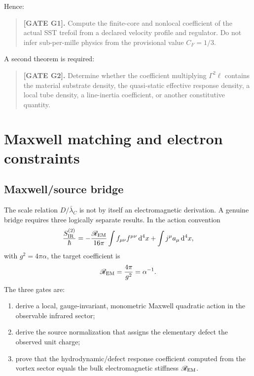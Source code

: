 \documentclass[aps,pre,preprint,notitlepage,nofootinbib,superscriptaddress]{revtex4-2}
\newcommand{\dd}{\mathrm d}
\newcommand{\lC}{\bar\lambda_C}
\begin{document}
Hence:

\begin{quote}
\textbf{[GATE G1].}
Compute the finite-core and nonlocal coefficient of the actual SST trefoil from a declared velocity profile and regulator.  Do not infer sub-per-mille physics from the provisional value \(C_F=1/3\).
\end{quote}

A second theorem is required:

\begin{quote}
\textbf{[GATE G2].}
Determine whether the coefficient multiplying \(\Gamma^2\ell\) contains the material substrate density, the quasi-static effective response density, a local tube density, a line-inertia coefficient, or another constitutive quantity.
\end{quote}

\section{Maxwell matching and electron constraints}
\label{sec:constraints}

\subsection{Maxwell/source bridge}

The scale relation \(D/\lC\) is not by itself an electromagnetic derivation.  A genuine bridge requires three logically separate results.  In the action convention
\begin{equation}
  \frac{S_{\rm IR}^{(2)}}{\hbar}
  =
  -\frac{\mathscr R_{\rm EM}}{16\pi}
  \int f_{\mu\nu}f^{\mu\nu}\,\dd^4x
  +
  \int j^\mu a_\mu\,\dd^4x,
  \label{eq:IR-action}
\end{equation}
with \(g^2=4\pi\alpha\), the target coefficient is
\begin{equation}
  \mathscr R_{\rm EM}
  =
  \frac{4\pi}{g^2}
  =
  \alpha^{-1}.
  \label{eq:EM-stiffness}
\end{equation}
The three gates are:

\begin{enumerate}[label=\textbf{B2\alph*:},leftmargin=*]
  \item derive a local, gauge-invariant, monometric Maxwell quadratic action in the observable infrared sector;
  \item derive the source normalization that assigns the elementary defect the observed unit charge;
  \item prove that the hydrodynamic/defect response coefficient computed from the vortex sector equals the bulk electromagnetic stiffness \(\mathscr R_{\rm EM}\).
\end{enumerate}
\end{document}
